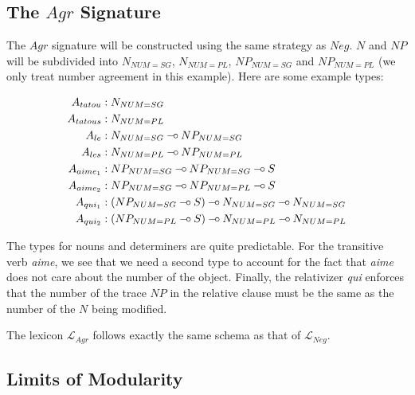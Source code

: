 \documentclass{llncs}
\def\limp {\mathbin{{-}\mkern-3.5mu{\circ}}}
\begin{document}
\subsection{The $Agr$ Signature}

The $Agr$ signature will be constructed using the same strategy as $Neg$. $N$
and $NP$ will be subdivided into $N_{NUM{=}SG}$, $N_{NUM{=}PL}$,
$NP_{NUM{=}SG}$ and $NP_{NUM{=}PL}$ (we only treat number agreement in this
example). Here are some example types:

\begin{align*}
A_{tatou} &: N_{NUM{=}SG} \\
A_{tatous} &: N_{NUM{=}PL} \\
A_{le} &: N_{NUM{=}SG} \limp NP_{NUM{=}SG} \\
A_{les} &: N_{NUM{=}PL} \limp NP_{NUM{=}PL} \\
A_{aime_1} &: NP_{NUM{=}SG} \limp NP_{NUM{=}SG} \limp S \\
A_{aime_2} &: NP_{NUM{=}SG} \limp NP_{NUM{=}PL} \limp S \\
A_{qui_1} &: (NP_{NUM{=}SG} \limp S) \limp N_{NUM{=}SG} \limp N_{NUM{=}SG} \\
A_{qui_2} &: (NP_{NUM{=}PL} \limp S) \limp N_{NUM{=}PL} \limp N_{NUM{=}PL}
\end{align*}

The types for nouns and determiners are quite predictable. For the transitive
verb \emph{aime}, we see that we need a second type to account for the fact
that \emph{aime} does not care about the number of the object. Finally, the
relativizer \emph{qui} enforces that the number of the trace $NP$ in the
relative clause must be the same as the number of the $N$ being modified.

The lexicon $\mathcal{L}_{Agr}$ follows exactly the same schema as that of
$\mathcal{L}_{Neg}$.

\subsection{Limits of Modularity}
\end{document}
